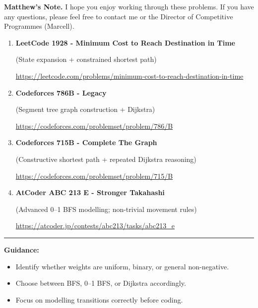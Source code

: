 \documentclass[11pt]{article}
\begin{document}
\medskip

\textbf{Matthew's Note.} I hope you enjoy working through these problems.  
If you have any questions, please feel free to contact me or the Director of Competitive Programmes (Marcell).

\vspace{0.8em}

\begin{enumerate}

    \item \textbf{LeetCode 1928 - Minimum Cost to Reach Destination in Time}

    (State expansion + constrained shortest path)

    \vspace{0.3em}
    {\small\url{https://leetcode.com/problems/minimum-cost-to-reach-destination-in-time}}

    \vspace{0.8em}

    \item \textbf{Codeforces 786B - Legacy}

    (Segment tree graph construction + Dijkstra)

    \vspace{0.3em}
    {\small\url{https://codeforces.com/problemset/problem/786/B}}

    \vspace{0.8em}

    \item \textbf{Codeforces 715B - Complete The Graph}

    (Constructive shortest path + repeated Dijkstra reasoning)

    \vspace{0.3em}
    {\small\url{https://codeforces.com/problemset/problem/715/B}}

    \vspace{0.8em}

    \item \textbf{AtCoder ABC 213 E - Stronger Takahashi}

    (Advanced 0--1 BFS modelling; non-trivial movement rules)

    \vspace{0.3em}
    {\small\url{https://atcoder.jp/contests/abc213/tasks/abc213_e}}

\end{enumerate}

\vspace{1em}

\hrule
\vspace{1em}

\noindent
\textbf{Guidance:}
\begin{itemize}
    \item Identify whether weights are uniform, binary, or general non-negative.
    \item Choose between BFS, 0--1 BFS, or Dijkstra accordingly.
    \item Focus on modelling transitions correctly before coding.
\end{itemize}
\end{document}
